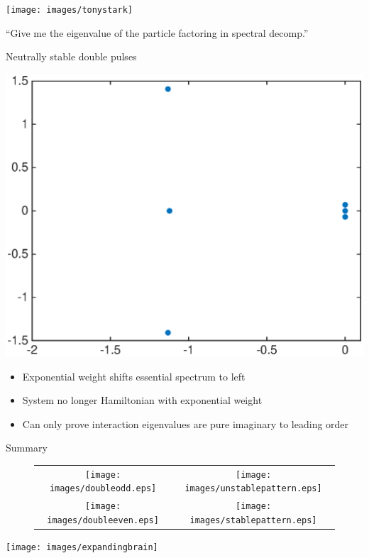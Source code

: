 \documentclass[16pt]{beamer}
\begin{document}
\begin{frame}
	\fontsize{16}{7.2}\selectfont
	\begin{center}
		\texttt{[image: images/tonystark]}
	\end{center}
	``Give me the eigenvalue of the particle factoring in spectral decomp.''
\end{frame}

\begin{frame}{Neutrally stable double pulses}
	\fontsize{14}{7.2}\selectfont
	\begin{center}
		\includegraphics[width=0.5\linewidth]{images/stableeigweighted2}
	\end{center}
	\begin{itemize}
		\item Exponential weight shifts essential spectrum to left
		\item System no longer Hamiltonian with exponential weight
		\item Can only prove interaction eigenvalues are pure imaginary to leading order 
	\end{itemize}
\end{frame}

\begin{frame}{Summary}
	\fontsize{14}{7.2}\selectfont
	\begin{figure}[H]
	\begin{tabular}{cc}
	\texttt{[image: images/doubleodd.eps]} &
	\texttt{[image: images/unstablepattern.eps]} \\
	\texttt{[image: images/doubleeven.eps]} &
	\texttt{[image: images/stablepattern.eps]} 
	\end{tabular}
	\end{figure}
\end{frame}

\begin{frame}
	\begin{center}
		\texttt{[image: images/expandingbrain]}
	\end{center}
\end{frame}
\end{document}
